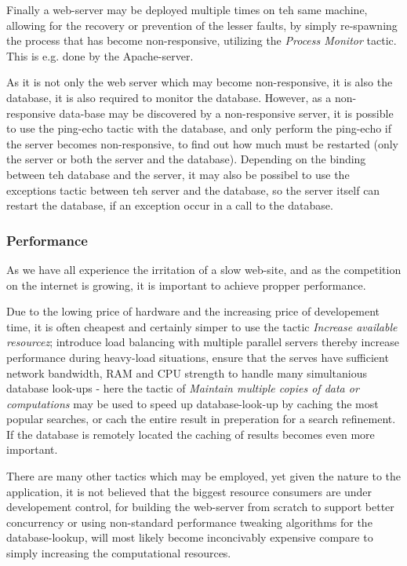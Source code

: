 Finally a web-server may be deployed multiple times on teh same machine, allowing for the recovery or prevention of the lesser faults, by simply re-spawning the process that has become non-responsive, utilizing the \emph{Process Monitor} tactic. This is e.g. done by the Apache-server.

As it is not only the web server which may become non-responsive, it is also the database, it is also required to monitor the database. However, as a non-responsive data-base may be discovered by a non-responsive server, it is possible to use the ping-echo tactic with the database, and only perform the ping-echo if the server becomes non-responsive, to find out how much must be restarted (only the server or both the server and the database). 
Depending on the binding between teh database and the server, it may also be possibel to use the exceptions tactic between teh server and the database, so the server itself can restart the database, if an exception occur in a call to the database. 

\subsubsection{Performance}

As we have all experience the irritation of a slow web-site, and as the competition on the internet is growing, it is important to achieve propper performance.

Due to the lowing price of hardware and the increasing price of developement time, it is often cheapest and certainly simper to use the tactic \emph{Increase available resourcez}; introduce load balancing with multiple parallel servers thereby increase performance during heavy-load situations, ensure that the serves have sufficient network bandwidth, RAM and CPU strength to handle many simultanious database look-ups - here the tactic of \emph{Maintain multiple copies of data or computations} may be used to speed up database-look-up by caching the most popular searches, or cach the entire result in preperation for a search refinement. If the database is remotely located the caching of results becomes even more important.

There are many other tactics which may be employed, yet given the nature to the application, it is not believed that the biggest resource consumers are under developement control, for building the web-server from scratch to support better concurrency or using non-standard performance tweaking algorithms for the database-lookup, will most likely become inconcivably expensive compare to simply increasing the computational resources.

